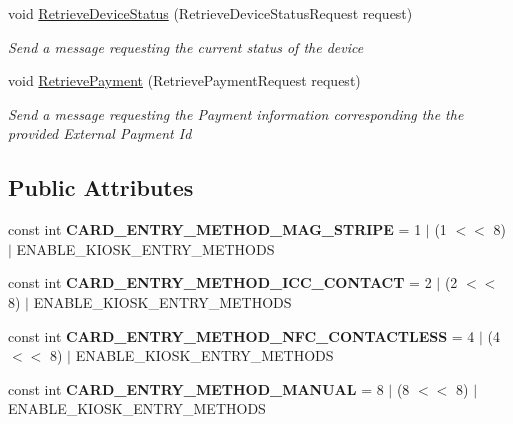 \begin{DoxyCompactItemize}
void \hyperlink{classcom_1_1clover_1_1remotepay_1_1sdk_1_1_clover_connector_a7a5404c24cac6be283c80a7983bfa4eb}{Retrieve\+Device\+Status} (Retrieve\+Device\+Status\+Request request)
\begin{DoxyCompactList}\small\item\em Send a message requesting the current status of the device \end{DoxyCompactList}\item 
void \hyperlink{classcom_1_1clover_1_1remotepay_1_1sdk_1_1_clover_connector_a786435c5849a2d8befd83173f70e05a7}{Retrieve\+Payment} (Retrieve\+Payment\+Request request)
\begin{DoxyCompactList}\small\item\em Send a message requesting the Payment information corresponding the the provided External Payment Id \end{DoxyCompactList}\end{DoxyCompactItemize}
\subsection*{Public Attributes}
\begin{DoxyCompactItemize}
\item 
\mbox{\label{classcom_1_1clover_1_1remotepay_1_1sdk_1_1_clover_connector_ac20215373cd03e34e424720009ae19e3}} 
const int {\bfseries C\+A\+R\+D\+\_\+\+E\+N\+T\+R\+Y\+\_\+\+M\+E\+T\+H\+O\+D\+\_\+\+M\+A\+G\+\_\+\+S\+T\+R\+I\+PE} = 1 $\vert$ (1 $<$$<$ 8) $\vert$ E\+N\+A\+B\+L\+E\+\_\+\+K\+I\+O\+S\+K\+\_\+\+E\+N\+T\+R\+Y\+\_\+\+M\+E\+T\+H\+O\+DS
\item 
\mbox{\label{classcom_1_1clover_1_1remotepay_1_1sdk_1_1_clover_connector_ad701af029fa86c4c128c3c633e3c75c7}} 
const int {\bfseries C\+A\+R\+D\+\_\+\+E\+N\+T\+R\+Y\+\_\+\+M\+E\+T\+H\+O\+D\+\_\+\+I\+C\+C\+\_\+\+C\+O\+N\+T\+A\+CT} = 2 $\vert$ (2 $<$$<$ 8) $\vert$ E\+N\+A\+B\+L\+E\+\_\+\+K\+I\+O\+S\+K\+\_\+\+E\+N\+T\+R\+Y\+\_\+\+M\+E\+T\+H\+O\+DS
\item 
\mbox{\label{classcom_1_1clover_1_1remotepay_1_1sdk_1_1_clover_connector_ad07e709975763f5f72268ee7d1fe7dbb}} 
const int {\bfseries C\+A\+R\+D\+\_\+\+E\+N\+T\+R\+Y\+\_\+\+M\+E\+T\+H\+O\+D\+\_\+\+N\+F\+C\+\_\+\+C\+O\+N\+T\+A\+C\+T\+L\+E\+SS} = 4 $\vert$ (4 $<$$<$ 8) $\vert$ E\+N\+A\+B\+L\+E\+\_\+\+K\+I\+O\+S\+K\+\_\+\+E\+N\+T\+R\+Y\+\_\+\+M\+E\+T\+H\+O\+DS
\item 
\mbox{\label{classcom_1_1clover_1_1remotepay_1_1sdk_1_1_clover_connector_a94afe7324fa5df3937c0140bf4596733}} 
const int {\bfseries C\+A\+R\+D\+\_\+\+E\+N\+T\+R\+Y\+\_\+\+M\+E\+T\+H\+O\+D\+\_\+\+M\+A\+N\+U\+AL} = 8 $\vert$ (8 $<$$<$ 8) $\vert$ E\+N\+A\+B\+L\+E\+\_\+\+K\+I\+O\+S\+K\+\_\+\+E\+N\+T\+R\+Y\+\_\+\+M\+E\+T\+H\+O\+DS
\end{DoxyCompactItemize}
